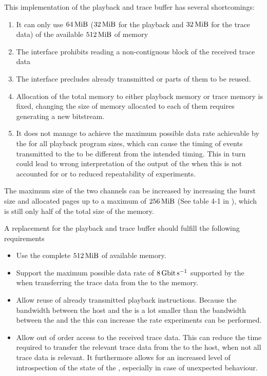 This implementation of the playback and trace buffer has several shortcomings:
\begin{enumerate}
  \item It can only use \(\SI{64}{\mebi\byte}\) (\(\SI{32}{\mebi\byte}\) for the playback and \(\SI{32}{\mebi\byte}\) for the trace data) of the available $\DDRSIZE{}$ of memory\label{point:limited_size}
  \item The \FIFO{} interface prohibits reading a non-contiguous block of the received trace data
  \item The \FIFO{} interface precludes already transmitted \PlaybackProgram{} or parts of them to be reused.
  \item Allocation of the total memory to either playback memory or trace memory is fixed, changing the size of memory allocated to each of them requires generating a new \FPGA{} bitstream.
  \item It does not manage to achieve the maximum possible data rate achievable by the \pbexec{} for all playback program sizes, which can cause the timing of events transmitted to the \ASIC{} to be different from the intended timing. This in turn could lead to wrong interpretation of the output of the \ASIC{} when this is not accounted for or to reduced repeatability of experiments.
\end{enumerate}
The maximum size of the two \VFIFO{} channels can be increased by increasing the burst size and allocated pages up to a maximum of \(\SI{256}{\mebi\byte}\) (See table 4-1 in \autocite{ref:vfifo}), which is still only half of the total size of the memory.

A replacement for the playback and trace buffer should fulfill the following requirements
\begin{itemize}
  \item Use the complete $\DDRSIZE{}$ of available memory.
  \item Support the maximum possible data rate of $\pbExecBandwidth{}$ supported by the \pbexec{} when transferring the trace data from the \pbexec{} to the memory.
  \item Allow reuse of already transmitted playback instructions. Because the bandwidth between the host and the \FPGA{} is a lot smaller than the bandwidth between the \FPGA{} and the \ASIC{} this can increase the rate experiments can be performed.
  \item Allow out of order access to the received trace data. This can reduce the time required to transfer the relevant trace data from the \FPGA{} to the host, when not all trace data is relevant.  It furthermore allows for an increased level of introspection of the state of the \FPGA{}, especially in case of unexpected behaviour.
\end{itemize}
